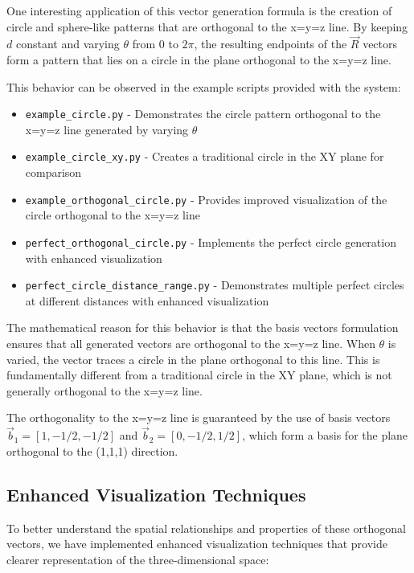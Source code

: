 One interesting application of this vector generation formula is the creation of circle and sphere-like patterns that are orthogonal to the x=y=z line. By keeping $d$ constant and varying $\theta$ from 0 to $2\pi$, the resulting endpoints of the $\vec{R}$ vectors form a pattern that lies on a circle in the plane orthogonal to the x=y=z line.

This behavior can be observed in the example scripts provided with the system:

\begin{itemize}
    \item \texttt{example\_circle.py} - Demonstrates the circle pattern orthogonal to the x=y=z line generated by varying $\theta$
    \item \texttt{example\_circle\_xy.py} - Creates a traditional circle in the XY plane for comparison
    \item \texttt{example\_orthogonal\_circle.py} - Provides improved visualization of the circle orthogonal to the x=y=z line
    \item \texttt{perfect\_orthogonal\_circle.py} - Implements the perfect circle generation with enhanced visualization
    \item \texttt{perfect\_circle\_distance\_range.py} - Demonstrates multiple perfect circles at different distances with enhanced visualization
\end{itemize}

The mathematical reason for this behavior is that the basis vectors formulation ensures that all generated vectors are orthogonal to the x=y=z line. When $\theta$ is varied, the vector traces a circle in the plane orthogonal to this line. This is fundamentally different from a traditional circle in the XY plane, which is not generally orthogonal to the x=y=z line.

The orthogonality to the x=y=z line is guaranteed by the use of basis vectors $\vec{b}_1 = [1, -1/2, -1/2]$ and $\vec{b}_2 = [0, -1/2, 1/2]$, which form a basis for the plane orthogonal to the (1,1,1) direction.

\subsection{Enhanced Visualization Techniques}

To better understand the spatial relationships and properties of these orthogonal vectors, we have implemented enhanced visualization techniques that provide clearer representation of the three-dimensional space:

